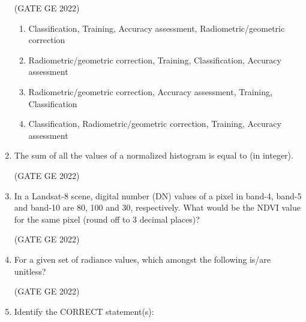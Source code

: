 \documentclass[journal,12pt,onecolumn]{IEEEtran}
\theoremstyle{remark}
\begin{document}
\begin{enumerate}
\hfill (GATE GE 2022)

\begin{enumerate}
    \item Classification, Training, Accuracy assessment, Radiometric/geometric correction
    \item Radiometric/geometric correction, Training, Classification, Accuracy assessment
    \item Radiometric/geometric correction, Accuracy assessment, Training, Classification
    \item Classification, Radiometric/geometric correction, Training, Accuracy assessment
\end{enumerate}

\item The sum of all the values of a normalized histogram is equal to \makebox[1cm]{\hrulefill} (in integer).

\hfill (GATE GE 2022)

\item In a Landsat-8 scene, digital number (DN) values of a pixel in band-4, band-5 and band-10 are 80, 100 and 30, respectively. What would be the NDVI value for the same pixel (round off to 3 decimal places)?

\hfill (GATE GE 2022)

\begin{enumerate}
\end{enumerate}

\item For a given set of radiance values, which amongst the following is/are unitless?

\hfill (GATE GE 2022)

\begin{enumerate}
\end{enumerate}

\item Identify the CORRECT statement(s):


\end{enumerate}
\end{document}
